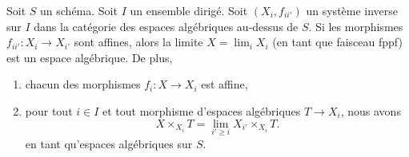 \begin{lemma}
\label{lemma-directed-inverse-system-has-limit}
Soit $S$ un schéma. Soit $I$ un ensemble dirigé.
Soit $(X_i, f_{ii'})$ un système inverse sur $I$
dans la catégorie des espaces algébriques au-dessus de $S$.
Si les morphismes $f_{ii'} : X_i \to X_{i'}$ sont affines, alors la
limite $X = \lim_i X_i$ (en tant que faisceau fppf) est un espace algébrique.
De plus,
\begin{enumerate}
\item chacun des morphismes $f_i : X \to X_i$ est affine,
\item pour tout $i \in I$ et tout morphisme d'espaces algébriques
$T \to X_i$, nous avons
$$
X \times_{X_i} T = \lim_{i' \geq i} X_{i'} \times_{X_i} T.
$$
en tant qu'espaces algébriques sur $S$.
\end{enumerate}
\end{lemma}

